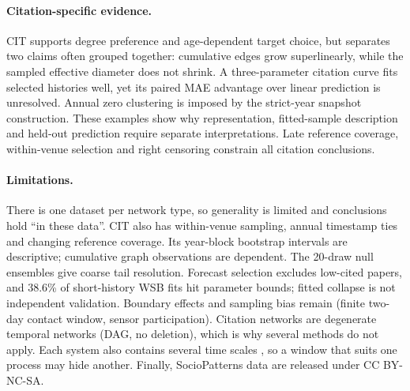 \paragraph{Citation-specific evidence.}
CIT supports degree preference and age-dependent target choice, but separates two
claims often grouped together: cumulative edges grow superlinearly, while the
sampled effective diameter does not shrink. A three-parameter citation curve
fits selected histories well, yet its paired MAE advantage over linear prediction
is unresolved. Annual zero clustering is imposed by the strict-year snapshot
construction. These examples show why representation, fitted-sample description
and held-out prediction require separate interpretations. Late reference coverage,
within-venue selection and right censoring constrain all citation conclusions.

\paragraph{Limitations.}
There is one dataset per network type, so generality is limited and conclusions
hold ``in these data''. CIT also has within-venue sampling, annual timestamp ties and changing reference
coverage. Its year-block bootstrap intervals are descriptive; cumulative graph
observations are dependent. The 20-draw null ensembles give coarse tail resolution.
Forecast selection excludes low-cited papers, and 38.6\% of short-history WSB fits
hit parameter bounds; fitted collapse is not independent validation.
Boundary effects
and sampling bias remain (finite two-day contact window, sensor participation).
Citation networks are degenerate temporal networks (DAG, no deletion), which is
why several methods do not apply. Each system also contains several time scales
\citep{holme2015modern}, so a window that suits one process may hide another. Finally, SocioPatterns data are released under
CC BY-NC-SA.
